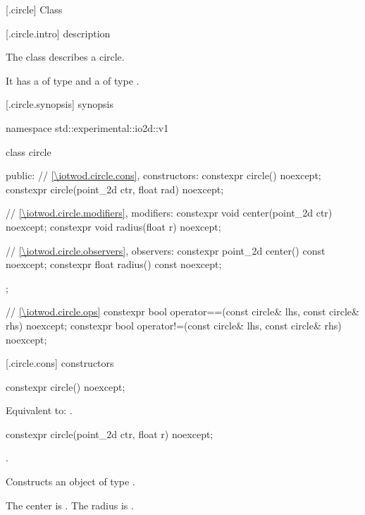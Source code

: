  [\iotwod.circle] {Class }

 [\iotwod.circle.intro] { description}

\pnum
{}%
The class  describes a circle.

\pnum
It has a  of type  and a  of type .

 [\iotwod.circle.synopsis] { synopsis}

\begin{codeblock}
namespace std::experimental::io2d::v1 {
  class circle {
  public:
    // \ref{\iotwod.circle.cons}, constructors:
    constexpr circle() noexcept;
    constexpr circle(point_2d ctr, float rad) noexcept;

    // \ref{\iotwod.circle.modifiers}, modifiers:
    constexpr void center(point_2d ctr) noexcept;
    constexpr void radius(float r) noexcept;
    
    // \ref{\iotwod.circle.observers}, observers:
    constexpr point_2d center() const noexcept;
    constexpr float radius() const noexcept;
  };

  // \ref{\iotwod.circle.ops}  
  constexpr bool operator==(const circle& lhs, const circle& rhs) noexcept;
  constexpr bool operator!=(const circle& lhs, const circle& rhs) noexcept;
}
\end{codeblock}

 [\iotwod.circle.cons] { constructors}

%
\begin{itemdecl}
constexpr circle() noexcept;
\end{itemdecl}
\begin{itemdescr}
\pnum
\effects
Equivalent to: .
\end{itemdescr}

%
\begin{itemdecl}
constexpr circle(point_2d ctr, float r) noexcept;
\end{itemdecl}
\begin{itemdescr}
\requires
{}.

\pnum
\effects
Constructs an object of type .

\pnum
The center is . The radius is .
\end{itemdescr}

